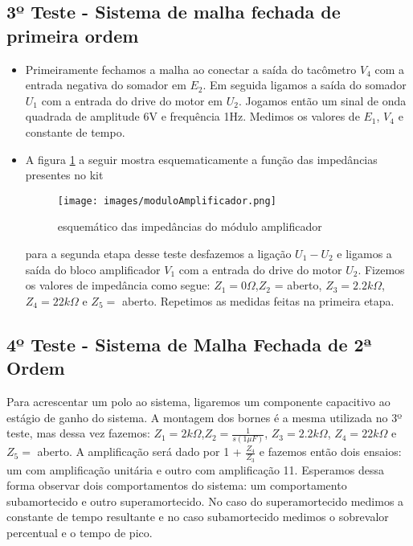\subsection{3º Teste - Sistema de malha fechada de primeira ordem}

\begin{itemize}
	\item Primeiramente fechamos a malha ao conectar a saída do tacômetro $V_4$ com a entrada negativa do somador em $E_2$. Em seguida ligamos a saída do somador $U_1$ com a entrada do drive do motor em $U_2$. Jogamos então um sinal de onda quadrada de amplitude 6V e frequência 1Hz. Medimos os valores de $E_1$, $V_4$ e constante de tempo.
    
    \item A figura \ref{fig:moduloAmplificador} a seguir mostra esquematicamente a função das impedâncias presentes no kit
    \begin{figure}[H]
  \centering
	\texttt{[image: images/moduloAmplificador.png]}
\caption{esquemático das impedâncias do módulo amplificador}
\label{fig:moduloAmplificador}
\end{figure}

para a segunda etapa desse teste desfazemos a ligação $U_1-U_2$ e ligamos a saída do bloco amplificador $V_1$ com a entrada do drive do motor $U_2$. Fizemos os valores de impedância como segue: $Z_1 = 0 \Omega$,$Z_2$ = aberto, $Z_3 = 2.2 k \Omega$, $Z_4 = 22 k \Omega$ e $Z_5 =$ aberto. Repetimos as medidas feitas na primeira etapa. 

\end{itemize}

\subsection{4º Teste - Sistema de Malha Fechada de 2ª Ordem}
Para acrescentar um polo ao sistema, ligaremos um componente capacitivo ao estágio de ganho do sistema. A montagem dos bornes é a mesma utilizada no 3º teste, mas dessa vez fazemos:
$Z_1 = 2 k \Omega$,$Z_2 = \frac{1}{s(1 \mu F )}$, $Z_3 = 2.2 k \Omega$, $Z_4 = 22 k \Omega$ e $Z_5 =$ aberto.
A amplificação será dado por 1 + $\frac{Z_4}{Z_3}$ e fazemos então dois ensaios: um com amplificação unitária e outro com amplificação 11. Esperamos dessa forma observar dois comportamentos do sistema: um comportamento subamortecido e outro superamortecido. No caso do superamortecido medimos a constante de tempo resultante e no caso subamortecido medimos o sobrevalor percentual e o tempo de pico.

